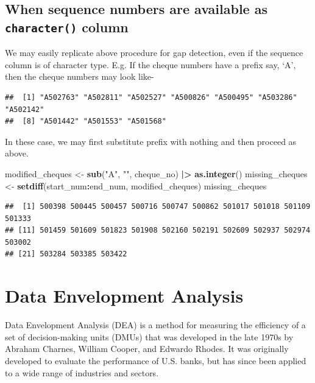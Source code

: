 \documentclass[
]{book}
\newenvironment{Shaded}{\begin{snugshade}}{\end{snugshade}}
\newcommand{\FunctionTok}[1]{\textcolor[rgb]{0.13,0.29,0.53}{\textbf{#1}}}
\newcommand{\NormalTok}[1]{#1}
\newcommand{\OtherTok}[1]{\textcolor[rgb]{0.56,0.35,0.01}{#1}}
\newcommand{\SpecialCharTok}[1]{\textcolor[rgb]{0.81,0.36,0.00}{\textbf{#1}}}
\newcommand{\StringTok}[1]{\textcolor[rgb]{0.31,0.60,0.02}{#1}}
\begin{document}
\hypertarget{when-sequence-numbers-are-available-as-character-column}{%
\section{\texorpdfstring{When sequence numbers are available as \texttt{character()} column}{When sequence numbers are available as character() column}}\label{when-sequence-numbers-are-available-as-character-column}}

We may easily replicate above procedure for gap detection, even if the sequence column is of character type. E.g. If the cheque numbers have a prefix say, `A', then the cheque numbers may look like-

\begin{verbatim}
##  [1] "A502763" "A502811" "A502527" "A500826" "A500495" "A503286" "A502142"
##  [8] "A501442" "A501553" "A501568"
\end{verbatim}

In these case, we may first substitute prefix with nothing and then proceed as above.

\begin{Shaded}
\begin{Highlighting}[]
\NormalTok{modified\_cheques }\OtherTok{\textless{}{-}} \FunctionTok{sub}\NormalTok{(}\StringTok{"A"}\NormalTok{, }\StringTok{""}\NormalTok{, cheque\_no) }\SpecialCharTok{|\textgreater{}} \FunctionTok{as.integer}\NormalTok{()}
\NormalTok{missing\_cheques }\OtherTok{\textless{}{-}} \FunctionTok{setdiff}\NormalTok{(start\_num}\SpecialCharTok{:}\NormalTok{end\_num, modified\_cheques)}
\NormalTok{missing\_cheques}
\end{Highlighting}
\end{Shaded}

\begin{verbatim}
##  [1] 500398 500445 500457 500716 500747 500862 501017 501018 501109 501333
## [11] 501459 501609 501823 501908 502160 502191 502609 502937 502974 503002
## [21] 503284 503385 503422
\end{verbatim}

\hypertarget{data-envelopment-analysis}{%
\chapter{Data Envelopment Analysis}\label{data-envelopment-analysis}}

Data Envelopment Analysis (DEA) is a method for measuring the efficiency of a set of decision-making units (DMUs) that was developed in the late 1970s by Abraham Charnes, William Cooper, and Edwardo Rhodes. It was originally developed to evaluate the performance of U.S. banks, but has since been applied to a wide range of industries and sectors.
\end{document}
